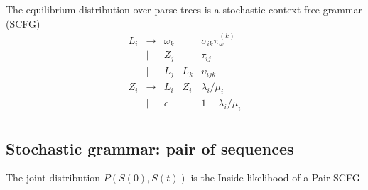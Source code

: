 \documentclass{article}
\begin{document}
The equilibrium distribution over parse trees is a stochastic context-free grammar (SCFG)
\[
\begin{array}{rclll}
  L_i & \to & \omega_k & & \sigma_{ik} \pi^{(k)}_{\omega} \\
      & | & Z_j & & \tau_{ij} \\
      & | & L_j & L_k & \upsilon_{ijk} \\
  Z_i & \to & L_i & Z_i & \lambda_i/\mu_i \\
        & | & \epsilon & & 1 - \lambda_i/\mu_i \\
\end{array}
\]

\subsection{Stochastic grammar: pair of sequences}

The joint distribution $P(S(0),S(t))$ is the Inside likelihood of a Pair SCFG
\end{document}
